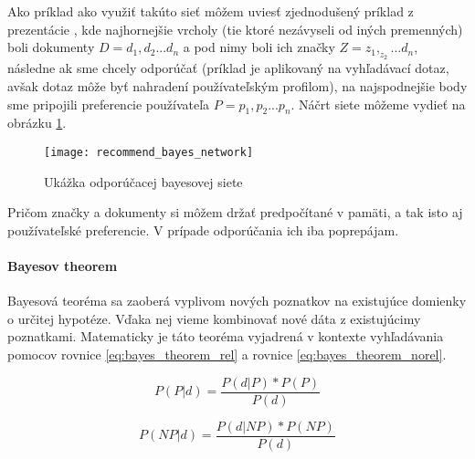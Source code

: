 Ako príklad ako využiť takúto sieť môžem uviesť zjednodušený príklad z
prezentácie \cite{probability_ir}, kde najhornejšie vrcholy (tie ktoré nezávyseli od iných 
premenných) boli dokumenty \(D = {d_1, d_2 ... d_n}\) a pod nimy
boli ich značky \(Z = {z_1, _z_2... d_n}\), následne ak sme chcely odporúčať (príklad je 
aplikovaný na vyhľadávací dotaz, avšak dotaz môže byť nahradení používateľským profilom),
na najspodnejšie body sme pripojili preferencie používateľa \(P = {p_1, p_2... p_n}\).
Náčrt siete môžeme vydieť na obrázku \ref{fig:recommend_bayes_network}.

\begin{figure}
    \begin{center}
        \texttt{[image: recommend\_bayes\_network]}
        \caption{Ukážka odporúčacej bayesovej siete}
        \label{fig:recommend_bayes_network}
    \end{center}
\end{figure}

Pričom značky a dokumenty si môžem držať predpočítané v pamäti, a tak isto aj používateľské 
preferencie. V prípade odporúčania ich iba poprepájam.

\paragraph{Bayesov theorem}

Bayesová teoréma sa zaoberá vyplivom nových poznatkov na existujúce 
domienky o určitej hypotéze. Vďaka nej vieme kombinovať nové dáta z existujúcimy poznatkami.
Matematicky je táto teoréma vyjadrená v kontexte vyhľadávania 
pomocov rovnice \ref{eq:bayes_theorem_rel} a rovnice \ref{eq:bayes_theorem_norel}.

\begin{equation} \label{eq:bayes_theorem_rel}
P(P|d) = \frac{P(d|P) * P(P)}{P(d)}
\end{equation}

\begin{equation} \label{eq:bayes_theorem_norel}
P(NP|d) = \frac{P(d|NP) * P(NP)}{P(d)}
\end{equation}

